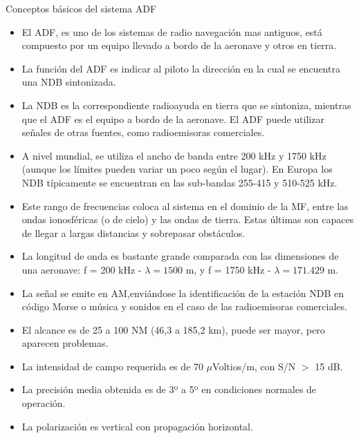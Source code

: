 \begin{tcolorbox}{Conceptos b\'asicos del sistema \ac{ADF}}

  \begin{itemize}
  \item El \ac{ADF}, es uno de los sistemas de radio navegación mas
    antiguos, est\'a compuesto por un equipo llevado a bordo de la
    aeronave y otros en tierra.

  \item La funci\'on del ADF es indicar al piloto la direcci\'on en la
    cual se encuentra una \ac{NDB} sintonizada.

  \item La \ac{NDB} es la correspondiente radioayuda en tierra que se
    sintoniza, mientras que el ADF es el equipo a bordo de la
    aeronave. El ADF puede utilizar se\~nales de otras fuentes, como
    radioemisoras comerciales.

  \item A nivel mundial, se utiliza el ancho de banda entre 200 kHz y
    1750 kHz (aunque los l\'imites pueden variar un poco seg\'un el
    lugar). En Europa los NDB t\'ipicamente se encuentran en las
    sub-bandas 255-415 y 510-525 kHz.

  \item Este rango de frecuencias coloca al sistema en el dominio de la
    \ac{MF}, entre las  ondas ionosf\'ericas (o de
    cielo) y las ondas de tierra. Estas \'ultimas son capaces de llegar a
    largas distancias y sobrepasar obst\'aculos.

  \item La longitud de onda es bastante grande
    comparada con las dimensiones de una aeronave: f = 200 kHz -
    $\lambda = 1500$ m, y f = 1750 kHz - $\lambda = 171.429$ m.

  \item La se\~nal se emite en \ac{AM},envi\'andose la
    identificaci\'on de la estaci\'on NDB en c\'odigo Morse
    o m\'usica y sonidos en el caso de las radioemisoras comerciales.

  \item El alcance es de 25 a 100 NM (46,3 a 185,2 km), puede ser
    mayor, pero aparecen problemas.

  \item La intensidad de campo requerida es de 70 $\mu$Voltios/m, con
    S/N $>$ 15 dB.

  \item La precisi\'on media obtenida es de 3º a 5º en condiciones
    normales de operaci\'on.

  \item La polarizaci\'on es vertical con propagaci\'on horizontal.
  \end{itemize}

\end{tcolorbox}

